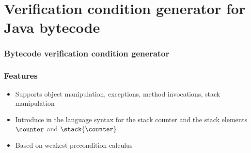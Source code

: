 \documentclass{beamer}
\begin{document}
\section{Verification condition generator for Java bytecode}
\begin{frame}[shrink]\frametitle{Bytecode verification condition generator}
\begin{center}
\end{center}

\end{frame} 

\begin{frame}\frametitle{Features} 
  \begin{itemize}

   
   \item Supports object manipulation, exceptions, method invocations, stack manipulation
    \item  Introduce in the language syntax for the stack counter and the 
         stack elements $\counter$ and $\stack{\counter}$ 
   \item Based on weakest precondition calculus
\end{itemize}

\end{frame}
\end{document}

